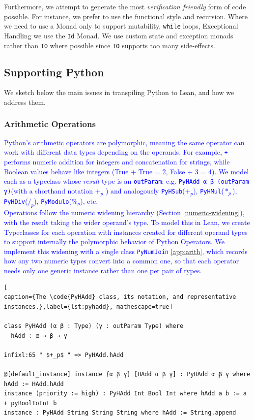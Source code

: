 \documentclass{article}
\newcommand{\code}{\lstinline}
\newcommand{\suggest}[1]{\textcolor{blue}{#1}}
\begin{document}
Furthermore, we attempt to generate the most \emph{verification friendly} form of code possible. For instance, we prefer to use the functional style and recursion. Where we need to use a Monad only to support mutability, \code{while} loops, Exceptional Handling we use the \code{Id} Monad. We use custom state and exception monads rather than \code{IO} where possible since \code{IO} supports too many side-effects.

\subsection{Supporting Python}

We sketch below the main issues in transpiling Python to Lean, and how we address them.

\subsubsection{Arithmetic Operations}\label{sec:arith}

\suggest{
Python's arithmetic operators are polymorphic, meaning the same operator can work with different data types depending on the operands. For example, \code{+} performs numeric addition for integers and concatenation for strings, while Boolean values behave like integers (True + True = 2, False + 3 = 4). We model each as a typeclass whose \emph{result} type is an \code{outParam}: e.g. \code{PyHAdd α β (outParam γ)}(with a shorthand notation $+_p$ ) and analogously \code{PyHSub}($+_p$), \code{PyHMul}($*_p$), \code{PyHDiv}($/_p$), \code{PyModulo}($\%_p$), etc. \\
Operations follow the numeric widening hierarchy (Section \ref{numeric-widening}), with the result taking the wider operand's type. To model this in Lean, we create Typeclasses for each operation with instances created for different operand types to support internally the polymorphic behavior of Python Operators. We implement this widening with a single class \code{PyNumJoin} \ref{app:arith}, which records how any two numeric types convert into a common one, so that each operator needs only one generic instance rather than one per pair of types.}

\begin{lstlisting}[
caption={The \code{PyHAdd} class, its notation, and representative instances.},label={lst:pyhadd}, mathescape=true]

class PyHAdd (α β : Type) (γ : outParam Type) where
  hAdd : α → β → γ

infixl:65 " $+_p$ " => PyHAdd.hAdd

@[default_instance] instance {α β γ} [HAdd α β γ] : PyHAdd α β γ where hAdd := HAdd.hAdd
instance (priority := high) : PyHAdd Int Bool Int where hAdd a b := a + pyBoolToInt b
instance : PyHAdd String String String where hAdd := String.append
\end{lstlisting}
\end{document}
